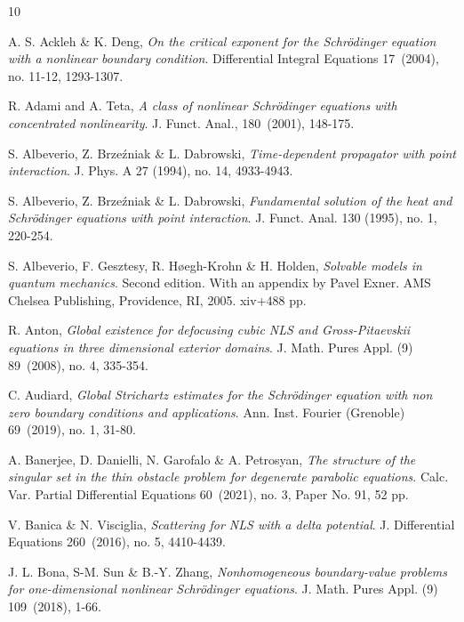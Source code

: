 \documentclass[11pt,letter]{amsart}
\numberwithin{equation}{section}
\numberwithin{equation}{section}
\begin{document}








\begin{thebibliography}{10}


A. S. Ackleh \& K. Deng, \emph{
On the critical exponent for the Schr\"odinger equation with a nonlinear boundary condition}.
Differential Integral Equations 17~(2004), no. 11-12, 1293-1307.

R. Adami and A. Teta, \emph{A class of nonlinear Schr\"odinger equations with concentrated nonlinearity}. J. Funct. Anal., 180~(2001), 148-175. 

S. Albeverio, Z. Brzeźniak \& L. Dabrowski, \emph{
 Time-dependent propagator with point interaction}.
J. Phys. A 27 (1994), no. 14, 4933-4943.

S. Albeverio, Z. Brzeźniak \& L. Dabrowski, \emph{Fundamental solution of the heat and Schr\"odinger equations with point interaction}.
J. Funct. Anal. 130 (1995), no. 1, 220-254. 


S. Albeverio, F. Gesztesy, R. Høegh-Krohn \& H. Holden, \emph{
Solvable models in quantum mechanics}.
Second edition. With an appendix by Pavel Exner.
AMS Chelsea Publishing, Providence, RI, 2005. xiv+488 pp.

R. Anton,
\emph{Global existence for defocusing cubic NLS and Gross-Pitaevskii equations in three dimensional exterior domains}.
J. Math. Pures Appl. (9) 89~(2008), no. 4, 335-354.

C. Audiard,  \emph{Global Strichartz estimates for the Schr\"odinger equation with non zero boundary conditions and applications}.
Ann. Inst. Fourier (Grenoble) 69~(2019), no. 1, 31-80.


A. Banerjee, D. Danielli, N. Garofalo \& A. Petrosyan, \emph{
The structure of the singular set in the thin obstacle problem for degenerate parabolic equations}.
Calc. Var. Partial Differential Equations 60~(2021), no. 3, Paper No. 91, 52 pp.

V. Banica \& N. Visciglia, \emph{
Scattering for NLS with a delta potential}.
J. Differential Equations 260~(2016), no. 5, 4410-4439.

J. L. Bona, S-M. Sun \& B.-Y. Zhang,  \emph{
Nonhomogeneous boundary-value problems for one-dimensional nonlinear Schr\"odinger equations}.
J. Math. Pures Appl. (9) 109~(2018), 1-66.


\end{thebibliography}
\end{document}
